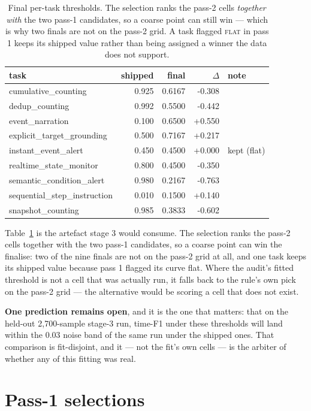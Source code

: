 \documentclass[11pt,a4paper]{article}
\begin{document}
\begin{table}[t]\centering\small\caption{Final per-task thresholds. The selection ranks the pass-2 cells \emph{together with} the two pass-1 candidates, so a coarse point can still win --- which is why two finals are not on the pass-2 grid. A task flagged \textsc{flat} in pass 1 keeps its shipped value rather than being assigned a winner the data does not support.}\label{tab:final}
\begin{tabular}{lrrrl}\toprule
task & shipped & final & $\Delta$ & note \\\midrule
cumulative\_counting & 0.925 & 0.6167 & -0.308 &  \\
dedup\_counting & 0.992 & 0.5500 & -0.442 &  \\
event\_narration & 0.100 & 0.6500 & +0.550 &  \\
explicit\_target\_grounding & 0.500 & 0.7167 & +0.217 &  \\
instant\_event\_alert & 0.450 & 0.4500 & +0.000 & kept (flat) \\
realtime\_state\_monitor & 0.800 & 0.4500 & -0.350 &  \\
semantic\_condition\_alert & 0.980 & 0.2167 & -0.763 &  \\
sequential\_step\_instruction & 0.010 & 0.1500 & +0.140 &  \\
snapshot\_counting & 0.985 & 0.3833 & -0.602 &  \\
\bottomrule\end{tabular}\end{table}


Table~\ref{tab:final} is the artefact stage 3 would consume. The
selection ranks the pass-2 cells together with the two pass-1 candidates, so a
coarse point can win the finalise: two of the nine finals are not on the pass-2
grid at all, and one task keeps its shipped value because pass 1 flagged its
curve flat. Where the audit's fitted threshold is not a cell that was actually
run, it falls back to the rule's own pick on the pass-2 grid --- the alternative
would be scoring a cell that does not exist.

\textbf{One prediction remains open}, and it is the one that
matters: that on the held-out 2{,}700-sample stage-3 run, time-F1 under these
thresholds will land within the 0.03 noise band of the same run under the shipped
ones. That comparison is fit-disjoint, and it --- not the fit's own cells --- is
the arbiter of whether any of this fitting was real.

\section{Pass-1 selections}
\end{document}
